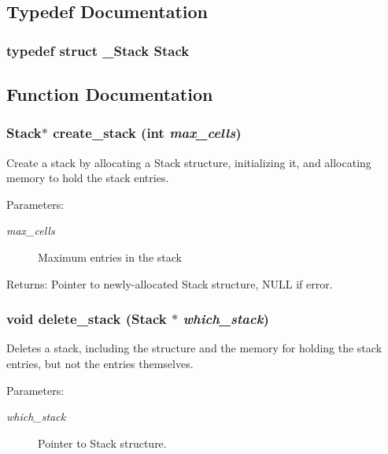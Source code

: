 \subsection{Typedef Documentation}
\subsubsection{\setlength{\rightskip}{0pt plus 5cm}typedef struct \bf{\_\-Stack} \bf{Stack}}\label{stack_8h_8e01fb06f51699c9a9dc51da4f58769e}




\subsection{Function Documentation}
\subsubsection{\setlength{\rightskip}{0pt plus 5cm}\bf{Stack}$\ast$ create\_\-stack (int {\em max\_\-cells})}\label{stack_8h_95307d53d00d64c88d94459933faab55}


Create a stack by allocating a Stack structure, initializing it, and allocating memory to hold the stack entries. \begin{Desc}
\item[Parameters:]
\begin{description}
\item[{\em max\_\-cells}]Maximum entries in the stack \end{description}
\end{Desc}
\begin{Desc}
\item[Returns:]Pointer to newly-allocated Stack structure, NULL if error. \end{Desc}
\subsubsection{\setlength{\rightskip}{0pt plus 5cm}void delete\_\-stack (\bf{Stack} $\ast$ {\em which\_\-stack})}\label{stack_8h_51a8e7dcd59c4eeacab0a6fcbd9779f0}


Deletes a stack, including the structure and the memory for holding the stack entries, but not the entries themselves. \begin{Desc}
\item[Parameters:]
\begin{description}
\item[{\em which\_\-stack}]Pointer to Stack structure. \end{description}
\end{Desc}
